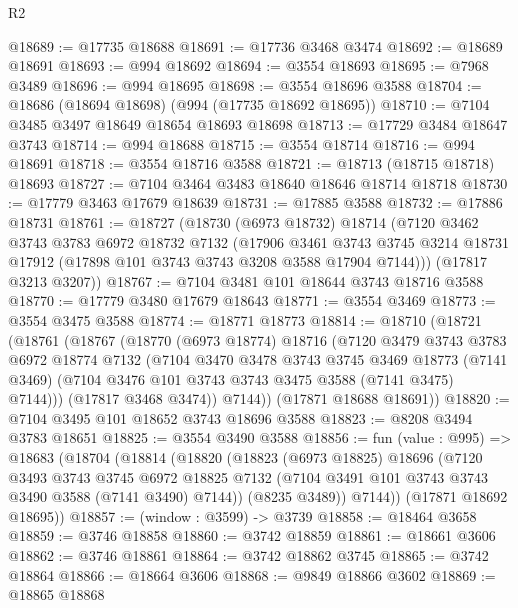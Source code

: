 \begin{lexlean}{R2}
\begin{coremodule}
@18689 := @17735 @18688
@18691 := @17736 @3468 @3474
@18692 := @18689 @18691
@18693 := @994 @18692
@18694 := @3554 @18693
@18695 := @7968 @3489
@18696 := @994 @18695
@18698 := @3554 @18696 @3588
@18704 := @18686 (@18694 @18698) (@994 (@17735 @18692 @18695))
@18710 := @7104 @3485 @3497 @18649 @18654 @18693 @18698
@18713 := @17729 @3484 @18647 @3743
@18714 := @994 @18688
@18715 := @3554 @18714
@18716 := @994 @18691
@18718 := @3554 @18716 @3588
@18721 := @18713 (@18715 @18718) @18693
@18727 := @7104 @3464 @3483 @18640 @18646 @18714 @18718
@18730 := @17779 @3463 @17679 @18639
@18731 := @17885 @3588
@18732 := @17886 @18731
@18761 := @18727
    (@18730
      (@6973 @18732)
      @18714
      (@7120
        @3462
        @3743
        @3783
        @6972
        @18732
        @7132
        (@17906
          @3461
          @3743
          @3745
          @3214
          @18731
          @17912
          (@17898 @101 @3743 @3743 @3208 @3588 @17904 @7144)))
      (@17817 @3213 @3207))
@18767 := @7104 @3481 @101 @18644 @3743 @18716 @3588
@18770 := @17779 @3480 @17679 @18643
@18771 := @3554 @3469
@18773 := @3554 @3475 @3588
@18774 := @18771 @18773
@18814 := @18710
    (@18721
      (@18761
        (@18767
          (@18770
            (@6973 @18774)
            @18716
            (@7120
              @3479
              @3743
              @3783
              @6972
              @18774
              @7132
              (@7104
                @3470
                @3478
                @3743
                @3745
                @3469
                @18773
                (@7141 @3469)
                (@7104 @3476 @101 @3743 @3743 @3475 @3588 (@7141 @3475) @7144)))
            (@17817 @3468 @3474))
          @7144))
      (@17871 @18688 @18691))
@18820 := @7104 @3495 @101 @18652 @3743 @18696 @3588
@18823 := @8208 @3494 @3783 @18651
@18825 := @3554 @3490 @3588
@18856 := fun (value : @995) =>
  @18683
    (@18704
      (@18814
        (@18820
          (@18823
            (@6973 @18825)
            @18696
            (@7120
              @3493
              @3743
              @3745
              @6972
              @18825
              @7132
              (@7104 @3491 @101 @3743 @3743 @3490 @3588 (@7141 @3490) @7144))
            (@8235 @3489))
          @7144))
      (@17871 @18692 @18695))
@18857 := (window : @3599) -> @3739
@18858 := @18464 @3658
@18859 := @3746 @18858
@18860 := @3742 @18859
@18861 := @18661 @3606
@18862 := @3746 @18861
@18864 := @3742 @18862 @3745
@18865 := @3742 @18864
@18866 := @18664 @3606
@18868 := @9849 @18866 @3602
@18869 := @18865 @18868

\end{coremodule}
\end{lexlean}
